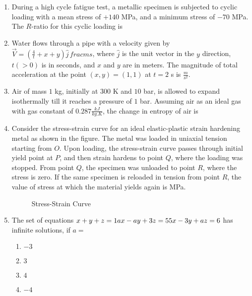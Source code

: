 \documentclass{article}
\newcommand{\brak}[1]{\left( #1 \right)}
\newcommand{\gt}{>}
\begin{document}
\begin{enumerate}
\item During a high cycle fatigue test, a metallic specimen is subjected to cyclic loading with a mean stress of $+140$ MPa, and a minimum stress of $-70$ MPa. The $R$-ratio  for this cyclic loading is 
    
\item Water flows through a pipe with a velocity given by $\vec{V} = \brak{ \frac{4}{t} + x + y } \hat{j} \, frac{m}{s}$, where $\hat{j}$ is the unit vector in the $y$ direction, $t \brak{ \gt 0 }$ is in seconds, and $x$ and $y$ are in meters. The magnitude of total acceleration at the point $\brak{ x, y } = \brak{ 1, 1 }$ at $t = 2$ s is  $\frac{m}{s^2}$.
    
\item Air of mass $1$ kg, initially at $300$ K and $10$ bar, is allowed to expand isothermally till it reaches a pressure of $1$ bar. Assuming air as an ideal gas with gas constant of $0.287 \frac{kJ}{kg.K}$, the change in entropy of air is 

\item Consider the stress-strain curve for an ideal elastic-plastic strain hardening metal as shown in the figure. The metal was loaded in uniaxial tension starting from $O$. Upon loading, the stress-strain curve passes through initial yield point at $P$, and then strain hardens to point $Q$, where the loading was stopped. From point $Q$, the specimen was unloaded to point $R$, where the stress is zero. If the same specimen is reloaded in tension from point $R$, the value of stress at which the material yields again is MPa.

\begin{figure}[!ht]
\centering
{}
\caption{Stress-Strain Curve}
\end{figure}

\item The set of equations
$
x + y + z = 1 \\
a x - a y + 3 z = 5 \\
5 x - 3 y + a z = 6
$
has infinite solutions, if $a =$

\begin{enumerate}
    \item $-3$
    \item $3$
    \item $4$
    \item $-4$
\end{enumerate}

\end{enumerate}
\end{document}
